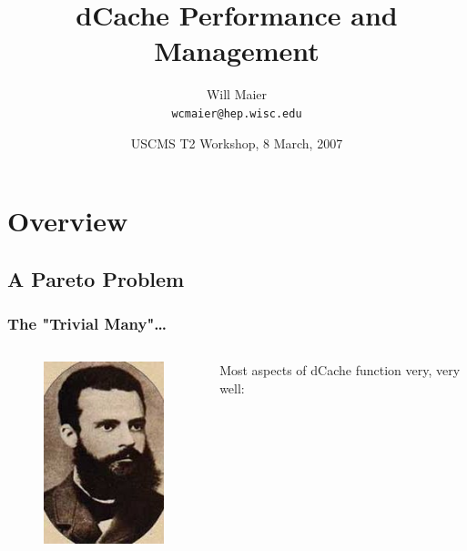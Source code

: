 \documentclass{beamer}
\title{dCache Performance and Management}
\author[Will Maier]{Will Maier \\ \texttt{wcmaier@hep.wisc.edu}}
\institute[Wisconsin]{University of Wisconsin - High Energy Physics}
\date[8 March, 2007]{USCMS T2 Workshop, 8 March, 2007}
\begin{document}
\begin{frame}
    \titlepage
\end{frame}

\section{Overview}
\subsection{A Pareto Problem}

\begin{frame}
\frametitle{The "Trivial Many"\dots{}}
\begin{columns}[t]
\begin{column}{.25\textwidth}
    \begin{figure}
        \includegraphics*[width=.8\textwidth]{Graphics/Pareto.jpg}
    \end{figure}
\end{column}
\begin{column}{.75\textwidth}
    \large{Most aspects of dCache function very, very well:}

\end{column}
\end{columns}
\end{frame}
\end{document}

